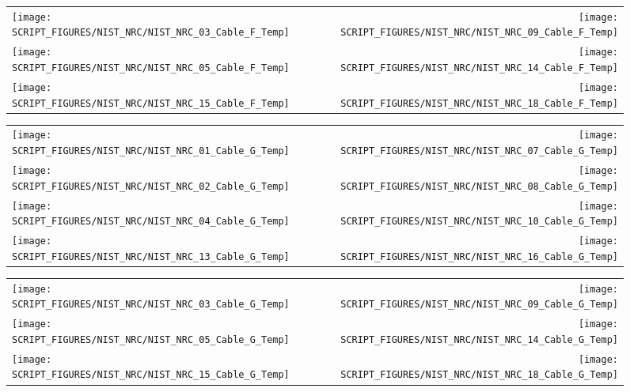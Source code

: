 \begin{figure}[p]
\begin{tabular*}{\textwidth}{l@{\extracolsep{\fill}}r}
\texttt{[image: SCRIPT\_FIGURES/NIST\_NRC/NIST\_NRC\_03\_Cable\_F\_Temp]} &
\texttt{[image: SCRIPT\_FIGURES/NIST\_NRC/NIST\_NRC\_09\_Cable\_F\_Temp]} \\
\texttt{[image: SCRIPT\_FIGURES/NIST\_NRC/NIST\_NRC\_05\_Cable\_F\_Temp]} &
\texttt{[image: SCRIPT\_FIGURES/NIST\_NRC/NIST\_NRC\_14\_Cable\_F\_Temp]} \\
\texttt{[image: SCRIPT\_FIGURES/NIST\_NRC/NIST\_NRC\_15\_Cable\_F\_Temp]} &
\texttt{[image: SCRIPT\_FIGURES/NIST\_NRC/NIST\_NRC\_18\_Cable\_F\_Temp]}
\end{tabular*}
\label{NIST_NRC_Cable_F_Open}
\end{figure}

\begin{figure}[p]
\begin{tabular*}{\textwidth}{l@{\extracolsep{\fill}}r}
\texttt{[image: SCRIPT\_FIGURES/NIST\_NRC/NIST\_NRC\_01\_Cable\_G\_Temp]} &
\texttt{[image: SCRIPT\_FIGURES/NIST\_NRC/NIST\_NRC\_07\_Cable\_G\_Temp]} \\
\texttt{[image: SCRIPT\_FIGURES/NIST\_NRC/NIST\_NRC\_02\_Cable\_G\_Temp]} &
\texttt{[image: SCRIPT\_FIGURES/NIST\_NRC/NIST\_NRC\_08\_Cable\_G\_Temp]} \\
\texttt{[image: SCRIPT\_FIGURES/NIST\_NRC/NIST\_NRC\_04\_Cable\_G\_Temp]} &
\texttt{[image: SCRIPT\_FIGURES/NIST\_NRC/NIST\_NRC\_10\_Cable\_G\_Temp]} \\
\texttt{[image: SCRIPT\_FIGURES/NIST\_NRC/NIST\_NRC\_13\_Cable\_G\_Temp]} &
\texttt{[image: SCRIPT\_FIGURES/NIST\_NRC/NIST\_NRC\_16\_Cable\_G\_Temp]}
\end{tabular*}
\label{NIST_NRC_Cable_G_Closed}
\end{figure}

\begin{figure}[p]
\begin{tabular*}{\textwidth}{l@{\extracolsep{\fill}}r}
\texttt{[image: SCRIPT\_FIGURES/NIST\_NRC/NIST\_NRC\_03\_Cable\_G\_Temp]} &
\texttt{[image: SCRIPT\_FIGURES/NIST\_NRC/NIST\_NRC\_09\_Cable\_G\_Temp]} \\
\texttt{[image: SCRIPT\_FIGURES/NIST\_NRC/NIST\_NRC\_05\_Cable\_G\_Temp]} &
\texttt{[image: SCRIPT\_FIGURES/NIST\_NRC/NIST\_NRC\_14\_Cable\_G\_Temp]} \\
\texttt{[image: SCRIPT\_FIGURES/NIST\_NRC/NIST\_NRC\_15\_Cable\_G\_Temp]} &
\texttt{[image: SCRIPT\_FIGURES/NIST\_NRC/NIST\_NRC\_18\_Cable\_G\_Temp]}
\end{tabular*}
\label{NIST_NRC_Cable_G_Open}
\end{figure}

